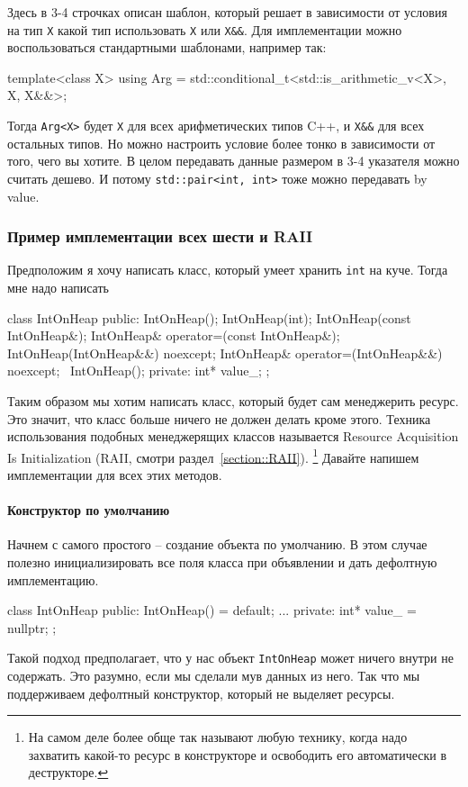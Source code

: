 Здесь в 3-4 строчках описан шаблон, который решает в зависимости от условия на тип \verb"X" какой тип использовать \verb"X" или \verb"X&&".
Для имплементации можно воспользоваться стандартными шаблонами, например так:
\begin{cppcode}
template<class X>
using Arg = std::conditional_t<std::is_arithmetic_v<X>, X, X&&>;
\end{cppcode}
Тогда \verb"Arg<X>" будет \verb"X" для всех арифметических типов C++, и \verb"X&&" для всех остальных типов.
Но можно настроить условие более тонко в зависимости от того, чего вы хотите.
В целом передавать данные размером в 3-4 указателя можно считать дешево.
И потому \verb"std::pair<int, int>" тоже можно передавать by value.

\subsubsection{Пример имплементации всех шести и RAII}
\label{section::siximpl}

Предположим я хочу написать класс, который умеет хранить \verb"int" на куче.
Тогда мне надо написать
\begin{cppcode}
class IntOnHeap {
public:
  IntOnHeap();
  IntOnHeap(int);
  IntOnHeap(const IntOnHeap&);
  IntOnHeap& operator=(const IntOnHeap&);
  IntOnHeap(IntOnHeap&&) noexcept;
  IntOnHeap& operator=(IntOnHeap&&) noexcept;
  ~IntOnHeap();
private:
  int* value_;
};
\end{cppcode}
Таким образом мы хотим написать класс, который будет сам менеджерить ресурс.
Это значит, что класс больше ничего не должен делать кроме этого.
Техника использования подобных менеджерящих классов называется Resource Acquisition Is Initialization (RAII, смотри раздел~\ref{section::RAII}).%
\footnote{На самом деле более обще так называют любую технику, когда надо захватить какой-то ресурс в конструкторе и освободить его автоматически в деструкторе.}
Давайте напишем имплементации для всех этих методов.

\paragraph{Конструктор по умолчанию}

Начнем с самого простого -- создание объекта по умолчанию.
В этом случае полезно инициализировать все поля класса при объявлении и дать дефолтную имплементацию.
\begin{cppcode}
class IntOnHeap {
public:
  IntOnHeap() = default;
  ...
private:
  int* value_ = nullptr;
};
\end{cppcode}
Такой подход предполагает, что у нас объект \verb"IntOnHeap" может ничего внутри не содержать.
Это разумно, если мы сделали мув данных из него.
Так что мы поддерживаем дефолтный конструктор, который не выделяет ресурсы.

